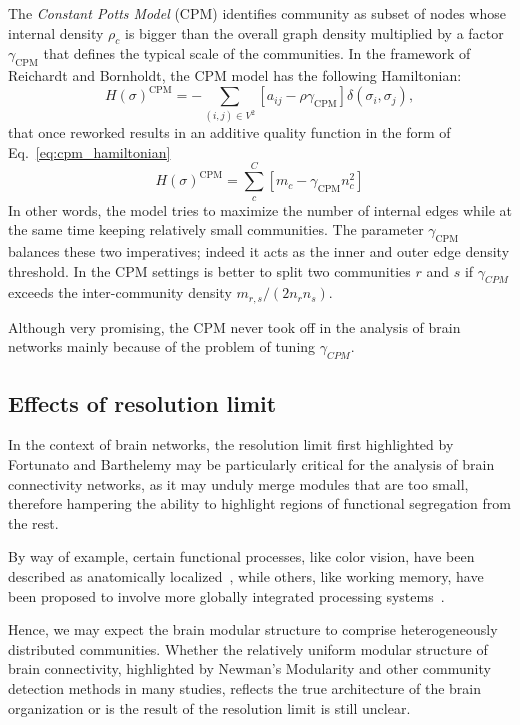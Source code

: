 The \emph{Constant Potts Model} (CPM) identifies community as subset of nodes whose internal density $\rho_c$ is bigger than the overall graph density multiplied by a factor $\gamma_{\textrm{CPM}}$ that defines the typical scale of the communities. In the framework of Reichardt and Bornholdt, the CPM model has the following Hamiltonian: 
\begin{equation}\label{eq:cpm_hamiltonian}
H(\sigma)^{\textrm{CPM}} = - \sum \limits_{(i,j) \in V^2} \left[ a_{ij} - \rho \gamma_{\textrm{CPM}} \right] \delta(\sigma_i,\sigma_j),
\end{equation}
that once reworked results in an additive quality function in the form of Eq.~\ref{eq:cpm_hamiltonian} 
\begin{equation}\label{eq:cpm_ermodel}
H(\sigma)^{\textrm{CPM}} = \sum \limits_c^C \left[m_c - \gamma_{\textrm{CPM}} n_c^2 \right] 
\end{equation}
In other words, the model tries to maximize the number of internal edges while at the same time keeping relatively small communities. The parameter $\gamma_{\textrm{CPM}}$ balances these two imperatives; indeed it acts as the inner and outer edge density threshold.
In the CPM settings is better to split two communities $r$ and $s$ if $\gamma_{CPM}$ exceeds the inter-community density $m_{r,s}/(2n_r n_s)$.

Although very promising, the CPM never took off in the analysis of brain networks mainly because of the problem of tuning $\gamma_{CPM}$.

\subsection{Effects of resolution limit}
In the context of brain networks, the resolution limit first highlighted by Fortunato and Barthelemy may be particularly critical for the analysis of brain connectivity networks, as it may unduly merge modules that are too small, therefore hampering the ability to highlight regions of functional segregation from the rest.

By way of example, certain functional processes, like color vision, have been described as anatomically localized~\cite{zeki1998}, while others, like working memory, have been proposed to involve more globally integrated processing systems~\cite{baddeley2003}.

Hence, we may expect the brain modular structure to comprise heterogeneously distributed communities. Whether the relatively uniform modular structure of brain connectivity, highlighted by Newman's Modularity and other community detection methods in many studies, reflects the true architecture of the brain organization or is the result of the resolution limit is still unclear.

